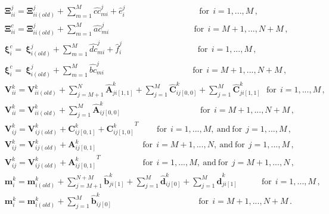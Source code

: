 \documentclass[review,preprint,12pt]{elsarticle}
\begin{document}
\begin{align}
& \boldsymbol{\Xi}_{ii}^{j} = \boldsymbol{\Xi}_{ii(old)}^{j} + \sum_{m=1}^{M}\hat{cc}_{mi}^{j} + \hat{e}_{i}^{j} \ \ \ \ \ \ \ \ \ \ \ \ \ \ \ \ \ \ \ \ \ \ \ \ \ \ \ \ \ \ \ \ \ \ \ \ \ \ \ \ \textrm{for}\ \ i = 1,...,M\,, \nonumber \\
& \boldsymbol{\Xi}_{ii}^{c} = \boldsymbol{\Xi}_{ii(old)}^{j} + \sum_{m=1}^{M}\hat{ac}_{mi}^{j} \ \ \ \ \ \ \ \ \ \ \ \ \ \ \ \ \ \ \ \ \ \ \ \ \ \ \ \ \ \ \ \ \ \ \ \ \ \ \ \ \ \ \ \ \ \ \textrm{for}\ \ i = M+1,...,N+M\,, \nonumber \\
& \boldsymbol{\xi}_{i}^{c} = \ \boldsymbol{\xi}_{i(old)}^{j} + \sum_{m=1}^{M}\hat{dc}_{mi}^{j} + \hat{f}_{i}^{j} \ \ \ \ \ \ \ \ \ \ \ \ \ \ \ \ \ \ \ \ \ \ \ \ \ \ \ \ \ \ \ \ \ \ \ \ \ \ \ \ \ \textrm{for}\ \ i = 1,...,M\,, \nonumber \\
& \boldsymbol{\xi}_{i}^{c} = \ \boldsymbol{\xi}_{i(old)}^{j} +  \sum_{m=1}^{M}\hat{bc}_{mi}^{j} \ \ \ \ \ \ \ \ \ \ \ \ \ \ \ \ \ \  \ \ \ \ \ \ \ \ \ \ \ \ \ \ \ \ \ \ \ \ \ \ \ \ \ \ \ \ \ \  \textrm{for}\ \ i = M+1,...,N+M\,, \nonumber \\
& \boldsymbol{V}_{ii}^{k} = \boldsymbol{V}_{ii(old)}^{k} +  \sum_{j=M+1}^{N}\hat{\boldsymbol{A}}_{ji[1,1]}^{k} + \sum_{j=1}^{M}\hat{\boldsymbol{C}}_{ij[0,0]}^{k} + \sum_{j=1}^{M}\hat{\boldsymbol{C}}_{ji[1,1]}^{k} \ \ \  \textrm{for}\ \ i = 1,...,M\,, \nonumber \\
& \boldsymbol{V}_{ii}^{k} = \boldsymbol{V}_{ii(old)}^{k} +   \sum_{j=1}^{M}\hat{\boldsymbol{A}}_{ij[0,0]}^{k} \ \ \ \ \ \ \ \ \ \ \ \ \ \ \ \ \ \ \ \ \ \ \ \ \ \ \ \ \ \ \ \ \ \ \ \ \ \ \ \ \ \ \ \textrm{for}\ \ i = M+1,...,N+M\,, \nonumber \\
& \boldsymbol{V}_{ij}^{k} = \boldsymbol{V}_{ij(old)}^{k} + \boldsymbol{C}_{ij[0,1]}^{k} + {\boldsymbol{C}_{ij[1,0]}^{k}}^T \ \ \ \ \ \ \ \ \ \ \textrm{for}\ \ i = 1,...,M,\ \textrm{and}\ \textrm{for}\ \ j = 1,...,M\,, \nonumber \\
& \boldsymbol{V}_{ij}^{k} = \boldsymbol{V}_{ij(old)}^{k} + \boldsymbol{A}_{ij[0,1]}^{k} \ \ \ \ \ \ \ \ \ \ \ \  \ \ \ \ \ \ \ \ \ \ \ \ \ \textrm{for}\ \ i = M+1,...,N,\ \textrm{and}\ \textrm{for}\ \ j = 1,...,M\,, \nonumber \\
& \boldsymbol{V}_{ij}^{k} = \boldsymbol{V}_{ij(old)}^{k} + {\boldsymbol{A}_{ij[0,1]}^{k}}^T \ \ \ \ \ \ \ \ \ \ \ \ \ \ \ \ \ \ \ \ \ \ \ \textrm{for}\ \ i = 1,...,M,\ \textrm{and}\ \textrm{for}\ \ j = M+1,...,N\,, \nonumber \\
& \boldsymbol{m}_{i}^{k} = \boldsymbol{m}_{i(old)}^{k} +  \sum_{j=M+1}^{N+M}\hat{\boldsymbol{b}}_{ji[1]}^{k} + \sum_{j=1}^{M}\hat{\boldsymbol{d}}_{ij[0]}^{k} + \sum_{j=1}^{M}\hat{\boldsymbol{d}}_{ji[1]}^{k} \ \ \ \ \ \ \ \ \ \ \ \ \ \textrm{for}\ \ i = 1,...,M\,, \nonumber \\
& \boldsymbol{m}_{i}^{k} = \boldsymbol{m}_{i(old)}^{k} + \sum_{j=1}^{M}\hat{\boldsymbol{b}}_{ij[0]}^{k} \ \ \ \ \ \ \ \ \ \ \ \ \ \ \ \ \ \ \ \ \ \ \ \ \ \ \ \ \ \ \ \ \ \ \ \ \ \ \ \ \ \ \ \ \ \ \ \textrm{for}\ \ i = M+1,...,N+M\,. \nonumber \\
\end{align}
\end{document}
